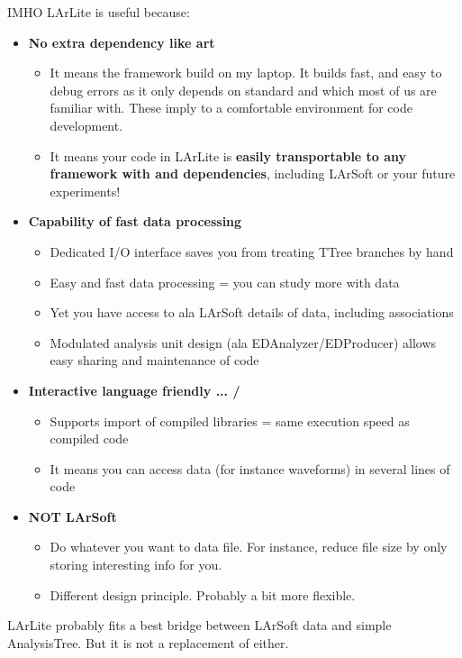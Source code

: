 IMHO LArLite is useful because:
\begin{itemize}
\item[] {\bf No extra dependency like {\ttfamily art}}
  \begin{itemize}
    \item It means the framework build on my laptop. It builds fast, and easy to debug errors as it only depends on standard \CPP and \ROOT which most of us are familiar with. These imply to a comfortable environment for code development.
    \item It means your code in LArLite is {\bf easily transportable to any framework with \CPP and \ROOT dependencies}, including LArSoft or your future experiments!
  \end{itemize}
\item[] {\bf Capability of fast data processing }
  \begin{itemize}
    \item Dedicated I/O interface saves you from treating TTree branches by hand
    \item Easy and fast data processing = you can study more with data
    \item Yet you have access to ala LArSoft details of data, including associations
    \item Modulated analysis unit design (ala EDAnalyzer/EDProducer) allows easy sharing and maintenance of code
  \end{itemize}
\item[] {\bf Interactive language friendly ... \python / \CINT}
  \begin{itemize}
    \item Supports import of compiled libraries = same execution speed as compiled code
    \item It means you can access data (for instance waveforms) in several lines of code
  \end{itemize}
\item[] {\bf NOT LArSoft}
  \begin{itemize}
    \item Do whatever you want to data file. For instance, reduce file size by only storing interesting info for you.
    \item Different design principle. Probably a bit more flexible.
  \end{itemize}
\end{itemize}    

LArLite probably fits a best bridge between LArSoft data and simple {\ttfamily AnalysisTree}. 
But it is not a replacement of either.

